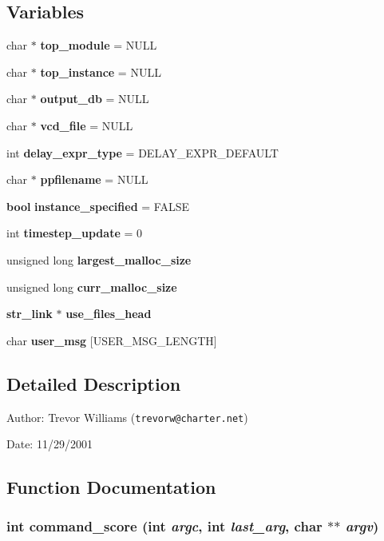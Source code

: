 \subsection*{Variables}
\begin{CompactItemize}
\item 
char $\ast$ {\bf top\_\-module} = NULL
\item 
char $\ast$ {\bf top\_\-instance} = NULL
\item 
char $\ast$ {\bf output\_\-db} = NULL
\item 
char $\ast$ {\bf vcd\_\-file} = NULL
\item 
int {\bf delay\_\-expr\_\-type} = DELAY\_\-EXPR\_\-DEFAULT
\item 
char $\ast$ {\bf ppfilename} = NULL
\item 
{\bf bool} {\bf instance\_\-specified} = FALSE
\item 
int {\bf timestep\_\-update} = 0
\item 
unsigned long {\bf largest\_\-malloc\_\-size}
\item 
unsigned long {\bf curr\_\-malloc\_\-size}
\item 
{\bf str\_\-link} $\ast$ {\bf use\_\-files\_\-head}
\item 
char {\bf user\_\-msg} [USER\_\-MSG\_\-LENGTH]
\end{CompactItemize}


\subsection{Detailed Description}
\begin{Desc}
\item[Author:]Trevor Williams ({\tt trevorw@charter.net}) \end{Desc}
\begin{Desc}
\item[Date:]11/29/2001\end{Desc}


\subsection{Function Documentation}
\subsubsection{\setlength{\rightskip}{0pt plus 5cm}int command\_\-score (int {\em argc}, int {\em last\_\-arg}, char $\ast$$\ast$ {\em argv})}\label{score_8c_a16}


